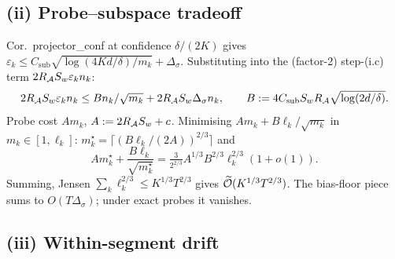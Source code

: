 \subsection*{(ii) Probe--subspace tradeoff}

Cor.~projector\_conf at confidence $\delta/(2K)$ gives
$\varepsilon_k\le C_{\mathrm{sub}}\sqrt{\log(4Kd/\delta)/m_k}+\Delta_\sigma$.
Substituting into the (factor-2) step-(i.c) term $2R_{\mathcal{A}} S_w\varepsilon_k n_k$:
\[
2R_{\mathcal{A}} S_w\varepsilon_k n_k\le B n_k/\sqrt{m_k}+2R_{\mathcal{A}} S_w\Delta_\sigma n_k,
\qquad B:=4C_{\mathrm{sub}} S_w R_{\mathcal{A}}\sqrt{\log(2d/\delta)}.
\]
Probe cost $Am_k$, $A:=2R_{\mathcal{A}} S_w+c$. Minimising
$Am_k+B\ell_k/\sqrt{m_k}$ in $m_k\in[1,\ell_k]$:
$m_k^\star=\lceil(B\ell_k/(2A))^{2/3}\rceil$ and
\begin{equation}
A m_k^\star+\frac{B\ell_k}{\sqrt{m_k^\star}}
=\tfrac{3}{2^{2/3}}A^{1/3}B^{2/3}\ell_k^{2/3}(1+o(1)).
\label{eq:opt_mk}
\end{equation}
Summing, Jensen $\sum_k\ell_k^{2/3}\le K^{1/3}T^{2/3}$ gives
$\widetilde{\mathcal{O}}(K^{1/3}T^{2/3})$. The bias-floor piece sums to
$O(T\Delta_\sigma)$; under exact probes it vanishes.

\subsection*{(iii) Within-segment drift}

